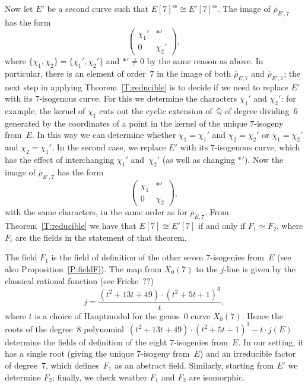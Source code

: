 \documentclass[12pt]{amsart}
\newcommand{\F}{\mathbb{F}}
\newcommand{\Q}{\mathbb{Q}}
\newcommand{\rhobar}{{\overline{\rho}}}
\DeclareMathOperator{\sss}{ss}
\numberwithin{equation}{section}
\theoremstyle{definition}
\theoremstyle{remark}
\begin{document}
Now let $E'$ be a second curve such that $E[7]^{\sss}\cong
E'[7]^{\sss}$. 
The image of $\rhobar_{E',7}$ has the form
\[
  \begin{pmatrix}\chi_1'&*'\\0&\chi_2'  \end{pmatrix},
  \]
where $\{\chi_1,\chi_2\}=\{\chi_1',\chi_2'\}$
and $*' \neq 0$ by the same reason as above.
In particular, there is an element of order~$7$ in the image of both $\rhobar_{E,7}$ and $\rhobar_{E',7}$; the next step in applying Theorem~\ref{T:reducible} is to decide if we need to replace $E'$ with its $7$-isogenous curve. For this we determine the characters
$\chi_1'$ and $\chi_2'$: for
example, the kernel of $\chi_1$ cuts out the cyclic extension of~$\Q$
of degree dividing~$6$ generated by the coordinates of a point in the
kernel of the unique $7$-isogeny from~$E$. 
In this way we can
determine whether $\chi_1=\chi_1'$ and $\chi_2=\chi_2'$ or $\chi_1=\chi_2'$ and $\chi_2=\chi_1'$.
In the second case, we replace $E'$ with its $7$-isogenous curve,
which has the effect of interchanging $\chi_1'$ 
and~$\chi_2'$ (as well
as changing $*'$).  Now the image of $\rhobar_{E',7}$ has the form
\[
\begin{pmatrix}\chi_1&*'\\0&\chi_2  \end{pmatrix},
\]
with the same characters, in the same order as for $\rhobar_{E,7}$. From Theorem~\ref{T:reducible} we have that 
$E[7]\cong E'[7]$ if and only if $F_1 \simeq F_2$, where $F_i$ are the fields in the statement of that theorem. 


The field $F_1$ is
the field of definition of the other seven $7$-isogenies from~$E$ (see also Proposition~\ref{P:fieldF}).
The map from $X_0(7)$ to the $j$-line is given by the classical rational function (see Fricke~??)
\[
   j = \frac{(t^{2} + 13t + 49) \cdot (t^{2} + 5t + 1)^{3}}{t},
\]
where $t$ is a choice of Hauptmodul for the genus~$0$ curve $X_0(7)$. Hence the roots of the degree~$8$ polynomial~$(t^{2} + 13t + 49) \cdot
(t^{2} + 5t + 1)^{3} -t\cdot j(E)$ determine the fields of definition of the eight $7$-isogenies from~$E$. In our setting, it has a single
root (giving the unique $7$-isogeny from~$E$) and an irreducible
factor of degree~$7$, which defines~$F_1$ as an abstract field. Similarly, starting from $E'$ we determine $F_2$; finally, we check weather $F_1$ and $F_2$ are isomorphic.
\end{document}
